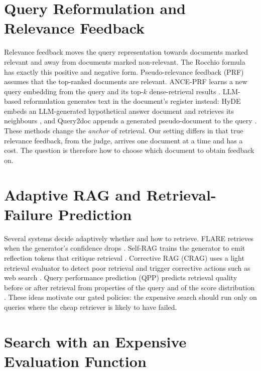 \section{Query Reformulation and Relevance Feedback}

Relevance feedback moves the query representation towards documents marked relevant and away from documents marked non-relevant. The Rocchio formula \citep{rocchio1971relevance} has exactly this positive and negative form. Pseudo-relevance feedback (PRF) assumes that the top-ranked documents are relevant. ANCE-PRF learns a new query embedding from the query and its top-$k$ dense-retrieval results \citep{yu2021anceprf}. LLM-based reformulation generates text in the document's register instead: HyDE embeds an LLM-generated hypothetical answer document and retrieves its neighbours \citep{gao2023hyde}, and Query2doc appends a generated pseudo-document to the query \citep{wang2023query2doc}. These methods change the \emph{anchor} of retrieval. Our setting differs in that true relevance feedback, from the judge, arrives one document at a time and has a cost. The question is therefore how to choose which document to obtain feedback on.

\section{Adaptive RAG and Retrieval-Failure Prediction}

Several systems decide adaptively whether and how to retrieve. FLARE retrieves when the generator's confidence drops \citep{jiang2023flare}. Self-RAG trains the generator to emit reflection tokens that critique retrieval \citep{asai2024selfrag}. Corrective RAG (CRAG) uses a light retrieval evaluator to detect poor retrieval and trigger corrective actions such as web search \citep{yan2024crag}. Query performance prediction (QPP) predicts retrieval quality before or after retrieval from properties of the query and of the score distribution \citep{cronentownsend2002predicting,carmel2010estimating}. These ideas motivate our gated policies: the expensive search should run only on queries where the cheap retriever is likely to have failed.

\section{Search with an Expensive Evaluation Function}

